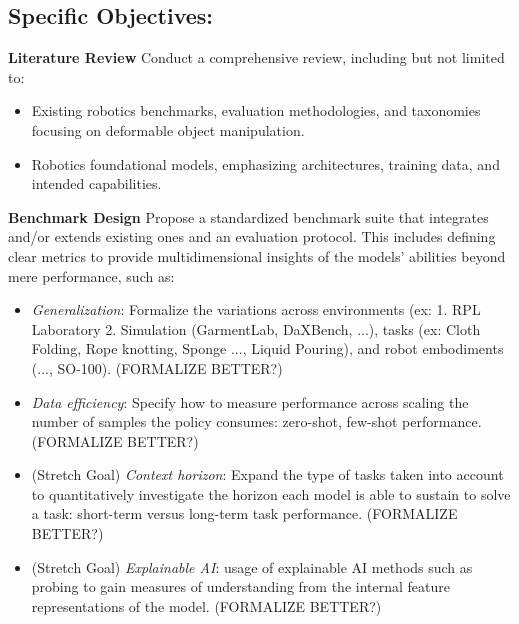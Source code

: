 \subsection{Specific Objectives:}
    \textbf{Literature Review}
        Conduct a comprehensive review, including but not limited to:
        \begin{itemize}
            \item Existing robotics benchmarks, evaluation methodologies, and taxonomies focusing on deformable object manipulation.
            \item Robotics foundational models, emphasizing architectures, training data, and intended capabilities.
        \end{itemize}
    \textbf{Benchmark Design}
        Propose a standardized benchmark suite that integrates and/or extends existing ones and an evaluation protocol. This includes defining clear metrics to provide multidimensional insights of the models' abilities beyond mere performance, such as:
        \begin{itemize}
            \item \textit{Generalization}: Formalize the variations across environments (ex: 1. RPL Laboratory 2. Simulation (GarmentLab, DaXBench, ...), tasks (ex: Cloth Folding, Rope knotting, Sponge ..., Liquid Pouring), and robot embodiments (..., SO-100). (FORMALIZE BETTER?)
            \item \textit{Data efficiency}: Specify how to measure performance across scaling the number of samples the policy consumes: zero-shot, few-shot performance. (FORMALIZE BETTER?)
            \item (Stretch Goal) \textit{Context horizon}: Expand the type of tasks taken into account to quantitatively investigate the horizon each model is able to sustain to solve a task: short-term versus long-term task performance. (FORMALIZE BETTER?)
            \item (Stretch Goal) \textit{Explainable AI}: usage of explainable AI methods such as probing \cite{Probing-VLA} to gain measures of understanding from the internal feature representations of the model. (FORMALIZE BETTER?)
        \end{itemize}

